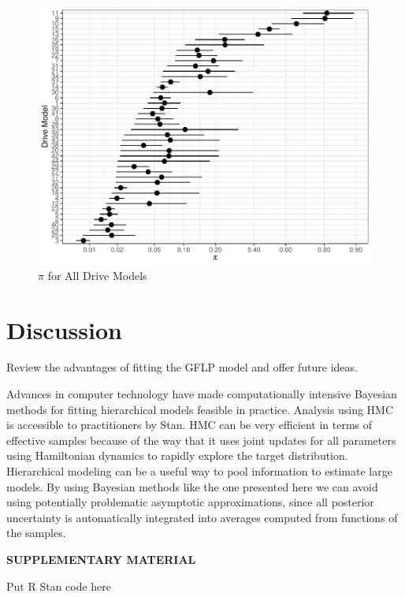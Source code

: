 \documentclass[12pt]{article}
\begin{document}
\begin{figure}[H]
    \centering
   \includegraphics[width=5.0in]{fig/pi_compare.pdf}
		\caption{$\pi$ for All Drive Models \label{fig:first}} 
\end{figure}

\section{Discussion}
Review the advantages of fitting the GFLP model and offer future ideas.  

Advances in computer technology have made computationally intensive Bayesian methods for fitting hierarchical models feasible in practice. Analysis using HMC is accessible to practitioners by Stan. HMC can be very efficient in terms of effective samples because of the way that it uses joint updates for all parameters using Hamiltonian dynamics to rapidly explore the target distribution. Hierarchical modeling can be a useful way to pool information to estimate large models. By using Bayesian methods like the one presented here we can avoid using potentially problematic asymptotic approximations, since all posterior uncertainty is automatically integrated into averages computed from functions of the samples.



    


\bigskip
\begin{center}
{\large\bf SUPPLEMENTARY MATERIAL}
\end{center}

\begin{description}

\item Put R Stan code here

\end{description}



\end{document}
